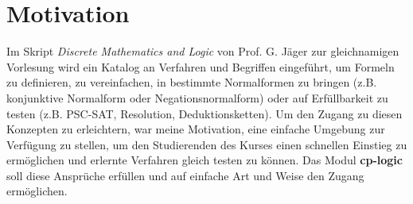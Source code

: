 \documentclass[11pt,a4paper,ngerman]{scrreprt}
\begin{document}
\section{Motivation}
Im Skript \textit{Discrete Mathematics and Logic} von Prof. G. Jäger zur gleichnamigen Vorlesung wird ein Katalog an Verfahren und Begriffen eingeführt, um Formeln zu definieren, zu vereinfachen, in bestimmte Normalformen zu bringen (z.B. konjunktive Normalform oder Negationsnormalform) oder auf Erfüllbarkeit zu testen (z.B. PSC-SAT, Resolution, Deduktionsketten). Um den Zugang zu diesen Konzepten zu erleichtern, war meine Motivation, eine einfache Umgebung zur Verfügung zu stellen, um den Studierenden des Kurses einen schnellen Einstieg zu ermöglichen und erlernte Verfahren gleich testen zu können. Das Modul \textbf{cp-logic} soll diese Ansprüche erfüllen und auf einfache Art und Weise den Zugang ermöglichen.
\end{document}
